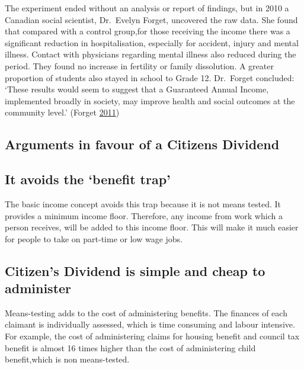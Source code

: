 \documentclass[]{tufte-handout}
\begin{document}
The experiment ended without an analysis or report of findings, but in
2010 a Canadian social scientist, Dr.~Evelyn Forget, uncovered the raw
data. She found that compared with a control group,for those receiving
the income there was a significant reduction in hospitalisation,
especially for accident, injury and mental illness. Contact with
physicians regarding mental illness also reduced during the period. They
found no increase in fertility or family dissolution. A greater
proportion of students also stayed in school to Grade 12. Dr.~Forget
concluded: `These results would seem to suggest that a Guaranteed Annual
Income, implemented broadly in society, may improve health and social
outcomes at the community level.' (Forget
\protect\hyperlink{ref-Forget2011}{2011})

\hypertarget{arguments-in-favour-of-a-citizens-dividend}{%
\subsection{Arguments in favour of a Citizens
Dividend}\label{arguments-in-favour-of-a-citizens-dividend}}

\hypertarget{it-avoids-the-benefit-trap}{%
\subsection{It avoids the `benefit
trap'}\label{it-avoids-the-benefit-trap}}

The basic income concept avoids this trap because it is not means
tested. It provides a minimum income floor. Therefore, any income from
work which a person receives, will be added to this income floor. This
will make it much easier for people to take on part-time or low wage
jobs.

\hypertarget{citizens-dividend-is-simple-and-cheap-to-administer}{%
\subsection{Citizen's Dividend is simple and cheap to
administer}\label{citizens-dividend-is-simple-and-cheap-to-administer}}

Means-testing adds to the cost of administering benefits. The finances
of each claimant is individually assessed, which is time consuming and
labour intensive. For example, the cost of administering claims for
housing benefit and council tax benefit is almost 16 times higher than
the cost of administering child benefit,which is non means-tested.
\end{document}
